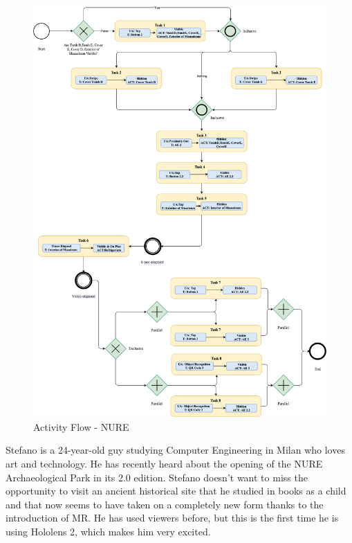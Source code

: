\begin{figure}[h]
	\centering
	\includegraphics[width=\linewidth]{Figures/Conceptual Model/NUREExample.png}
	\caption{Activity Flow - NURE}
	\label{fig:ActivityNURE}
\end{figure}

Stefano is a 24-year-old guy studying Computer Engineering in Milan who loves art and technology. He has recently heard about the opening of the NURE Archaeological Park in its 2.0 edition. Stefano doesn't want to miss the opportunity to visit an ancient historical site that he studied in books as a child and that now seems to have taken on a completely new form thanks to the introduction of MR. He has used viewers before, but this is the first time he is using Hololens 2, which makes him very excited. 

